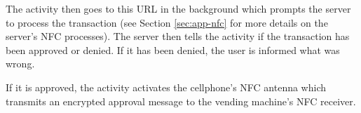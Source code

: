 The activity then goes to this URL in the background which prompts the server to
process the transaction (see Section \ref{sec:app-nfc} for more details on the
server's NFC processes). The server then tells the activity if the transaction
has been approved or denied. If it has been denied, the user is informed what was wrong. 

If it is approved, the activity activates the cellphone's NFC antenna which
transmits an encrypted approval message to the vending machine's NFC receiver. 
